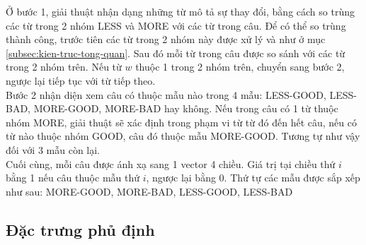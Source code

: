 Ở bước 1, giải thuật nhận dạng những từ mô tả sự thay đổi, bằng cách so trùng các từ trong 2 nhóm LESS và MORE với các từ trong câu. Để có thể so trùng thành công, trước tiên các từ trong 2 nhóm này được xử lý  và  như ở mục \ref{subsec:kien-truc-tong-quan}. Sau đó mỗi từ trong câu được so sánh với các từ trong 2 nhóm trên.  Nếu từ $w$ thuộc 1 trong 2 nhóm trên, chuyển sang bước 2, ngược lại tiếp tục với từ tiếp theo.\\


Bước 2 nhận diện xem câu có thuộc mẫu nào trong 4 mẫu: LESS-GOOD, LESS-BAD, MORE-GOOD, MORE-BAD hay không. Nếu trong câu có 1 từ thuộc nhóm MORE, giải thuật sẽ xác định trong phạm vi từ từ đó đến hết câu, nếu có từ nào thuộc nhóm GOOD, câu đó thuộc mẫu MORE-GOOD. Tương tự như vậy đối với 3 mẫu còn lại.\\

Cuối cùng, mỗi câu được ánh xạ sang 1 vector 4 chiều. Giá trị tại chiều thứ $i$ bằng 1 nếu câu thuộc mẫu thứ $i$, ngược lại bằng 0. Thứ tự các mẫu được sắp xếp như sau: MORE-GOOD, MORE-BAD, LESS-GOOD, LESS-BAD

\subsection{Đặc trưng phủ định} \label{sec:su-phu-dinh} \label{subsec:negation}
